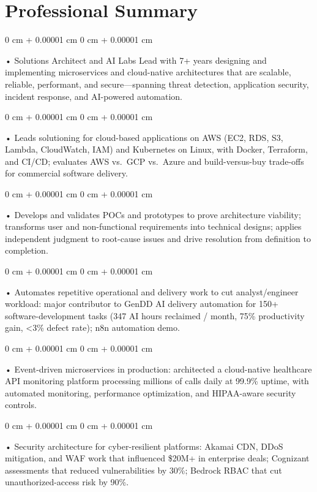 \documentclass[10pt, letterpaper]{article}
\newenvironment{onecolentry}{
    \begin{adjustwidth}{
        0 cm + 0.00001 cm
    }{
        0 cm + 0.00001 cm
    }
}{
    \end{adjustwidth}
} %
\begin{document}
    \section{Professional Summary}
        \vspace{2 pt }
        \begin{onecolentry}
            • Solutions Architect and AI Labs Lead with 7+ years designing and implementing microservices and cloud-native architectures that are scalable, reliable, performant, and secure---spanning threat detection, application security, incident response, and AI-powered automation.
        \end{onecolentry}
        \begin{onecolentry}
            • Leads solutioning for cloud-based applications on AWS (EC2, RDS, S3, Lambda, CloudWatch, IAM) and Kubernetes on Linux, with Docker, Terraform, and CI/CD; evaluates AWS vs.\ GCP vs.\ Azure and build-versus-buy trade-offs for commercial software delivery.
        \end{onecolentry}
        \begin{onecolentry}
            • Develops and validates POCs and prototypes to prove architecture viability; transforms user and non-functional requirements into technical designs; applies independent judgment to root-cause issues and drive resolution from definition to completion.
        \end{onecolentry}
        \begin{onecolentry}
            • Automates repetitive operational and delivery work to cut analyst/engineer workload: major contributor to GenDD AI delivery automation for 150+ software-development tasks (347 AI hours reclaimed / month, 75\% productivity gain, {<}3\% defect rate); n8n automation demo.
        \end{onecolentry}
        \begin{onecolentry}
            • Event-driven microservices in production: architected a cloud-native healthcare API monitoring platform processing millions of calls daily at 99.9\% uptime, with automated monitoring, performance optimization, and HIPAA-aware security controls.
        \end{onecolentry}
        \begin{onecolentry}
            • Security architecture for cyber-resilient platforms: Akamai CDN, DDoS mitigation, and WAF work that influenced \$20M+ in enterprise deals; Cognizant assessments that reduced vulnerabilities by 30\%; Bedrock RBAC that cut unauthorized-access risk by 90\%.
        \end{onecolentry}
\end{document}
